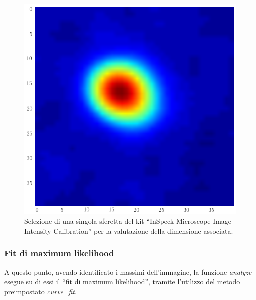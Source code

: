 \begin{figure}
 \centering
 \includegraphics[scale=.25]{img/CAP3punto.png}
 \caption{\small{Selezione di una singola sferetta del kit ``InSpeck Microscope Image Intensity Calibration'' per la valutazione della dimensione associata.}}
 \label{fig:punto}
\end{figure}

\subsubsection*{Fit di maximum likelihood}

A questo punto, avendo identificato i massimi dell'immagine, la funzione \textit{analyze} esegue su di essi il ``fit di maximum likelihood'', tramite l'utilizzo del metodo preimpostato \textit{curve\_fit}.

